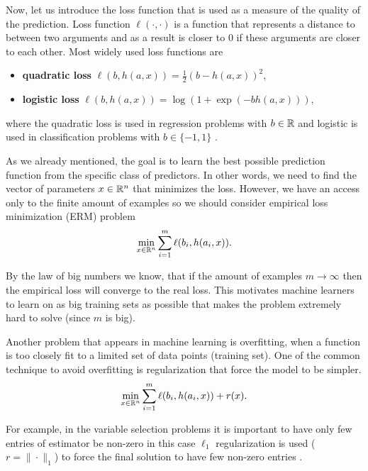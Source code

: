 Now, let us introduce the loss function that is used as a measure of the quality of the prediction. Loss function $\ell(\cdot,\cdot)$ is a function that represents a distance to between two arguments and as a result is closer to $0$ if these arguments are closer to each other. Most widely used loss functions are 
\begin{itemize}
    \item[] {\textbf{quadratic loss}} $\ell(b, h(a,x)) = \frac{1}{2}(b - h(a,x))^2$,
    \item[] {\textbf{logistic loss}} $\ell(b, h(a,x)) = \log(1 + \exp(-bh(a,x))),$
\end{itemize}
where the quadratic loss is used in regression problems with $b\in\mathbb{R}$ \cite{bhattacharya1966estimating} and logistic is used in classification problems with $b\in\{-1,1\}$ \cite{shao2014nonparallel, tang2004granular}.

As we already mentioned, the goal is to learn the best possible prediction function from the specific class of predictors. In other words, we need to find the vector of parameters $x\in\mathbb{R}^n$ that minimizes the loss. However, we have an access only to the finite amount of examples so we should consider empirical loss minimization (ERM) problem
\begin{equation}\label{eq:erm}
    \min_{x\in\mathbb{R}^n} \sum_{i=1}^m \ell(b_i, h(a_i,x)).
\end{equation}
    

By the law of big numbers we know, that if the amount of examples $m\rightarrow \infty$ then the empirical loss will converge to the real loss. This motivates machine learners to learn on as big training sets as possible that makes the problem extremely hard to solve (since $m$ is big). 

Another problem that appears in machine learning is overfitting, when a function is too closely fit to a limited set of data points (training set). One of the common technique to avoid overfitting is regularization that force the model to be simpler.
\begin{equation}\label{eq:erm_reg}
\min_{x\in\mathbb{R}^n} \sum_{i=1}^m \ell(b_i, h(a_i,x)) + r(x).
\end{equation}

For example, in the variable selection problems it is important to have only few entries of estimator be non-zero in this case $\ell_1$ regularization is used ($r = \|\cdot\|_1$) to force the final solution to have few non-zero entries \cite{bach2012optimization}.

